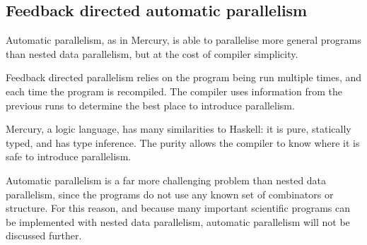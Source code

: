 





\subsection{Feedback directed automatic parallelism}

Automatic parallelism, as in Mercury\cite{bone2010automatic},
is able to parallelise more general programs than nested data parallelism,
but at the cost of compiler simplicity.

Feedback directed parallelism relies on the program being run multiple times,
and each time the program is recompiled.
The compiler uses information from the previous runs to determine the best place to introduce parallelism.

Mercury, a logic language, has many similarities to Haskell: it is pure, statically typed, and has type inference.
The purity allows the compiler to know where it is safe to introduce parallelism.

Automatic parallelism is a far more challenging problem than nested data parallelism,
since the programs do not use any known set of combinators or structure.
For this reason, and because many important scientific programs can be implemented with nested data parallelism\cite{blelloch1996programming}, 
automatic parallelism will not be discussed further.

